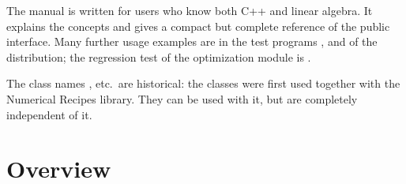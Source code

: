 The manual is written for users who know both C++ and linear algebra. It explains the concepts and
gives a compact but complete reference of the public interface. Many further usage examples are in the
test programs ,  and  of the distribution; the regression test of the
optimization module is .

The class names ,  etc.\ are historical: the classes were first used together with
the Numerical Recipes library. They can be used with it, but are completely independent of it.

\section{Overview}

